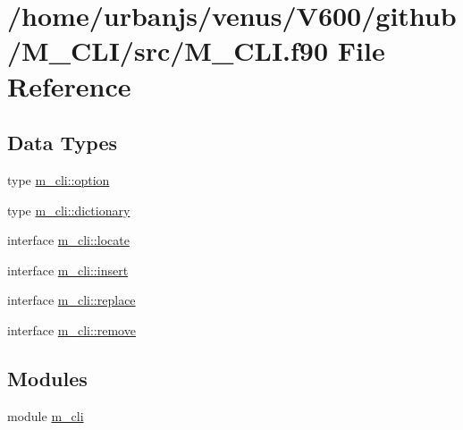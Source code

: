 \hypertarget{M__CLI_8f90}{}\section{/home/urbanjs/venus/\+V600/github/\+M\+\_\+\+C\+L\+I/src/\+M\+\_\+\+C\+LI.f90 File Reference}
\label{M__CLI_8f90}
\subsection*{Data Types}
\begin{DoxyCompactItemize}
\item 
type \mbox{\hyperlink{structm__cli_1_1option}{m\+\_\+cli\+::option}}
\item 
type \mbox{\hyperlink{structm__cli_1_1dictionary}{m\+\_\+cli\+::dictionary}}
\item 
interface \mbox{\hyperlink{interfacem__cli_1_1locate}{m\+\_\+cli\+::locate}}
\item 
interface \mbox{\hyperlink{interfacem__cli_1_1insert}{m\+\_\+cli\+::insert}}
\item 
interface \mbox{\hyperlink{interfacem__cli_1_1replace}{m\+\_\+cli\+::replace}}
\item 
interface \mbox{\hyperlink{interfacem__cli_1_1remove}{m\+\_\+cli\+::remove}}
\end{DoxyCompactItemize}
\subsection*{Modules}
\begin{DoxyCompactItemize}
\item 
module \mbox{\hyperlink{namespacem__cli}{m\+\_\+cli}}
\end{DoxyCompactItemize}
